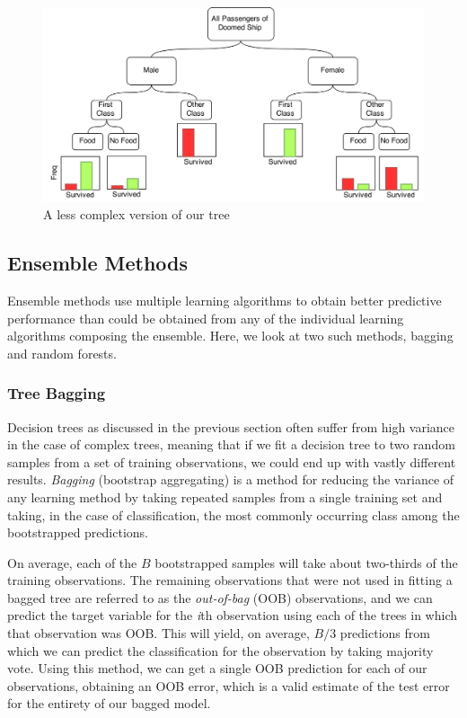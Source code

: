 \documentclass[preprint,12pt]{elsarticle}
\begin{document}
\begin{figure}[h]
	\centering
	\includegraphics[width=1\textwidth]{PrunedBoat}
	\caption{A less complex version of our tree}
	\label{fig:Pruned}
\end{figure}

\subsection{Ensemble Methods}
Ensemble methods use multiple learning algorithms to obtain better predictive performance than could be obtained from any of the individual learning algorithms composing the ensemble. Here, we look at two such methods, bagging and random forests.


\subsubsection{Tree Bagging}
Decision trees as discussed in the previous section often suffer from high variance in the case of complex trees, meaning that if we fit a decision tree to two random samples from a set of training observations, we could end up with vastly different results\cite{ESL}. \textit{Bagging} (bootstrap aggregating) is a method for reducing the variance of any learning method by taking repeated samples from a single training set and taking, in the case of classification, the most commonly occurring class among the bootstrapped predictions. 

On average, each of the $B$ bootstrapped samples will take about two-thirds of the training observations.  The remaining observations that were not used in fitting a bagged tree are referred to as the \textit{out-of-bag} (OOB) observations, and we can predict the target variable for the \textit{i}th observation using each of the trees in which that observation was OOB. This will yield, on average, $B/3$ predictions from which we can predict the classification for the observation by taking majority vote.\cite{ISLR} Using this method, we can get a single OOB prediction for each of our observations, obtaining an OOB error, which is a valid estimate of the test error for the entirety of our bagged model.
\end{document}
